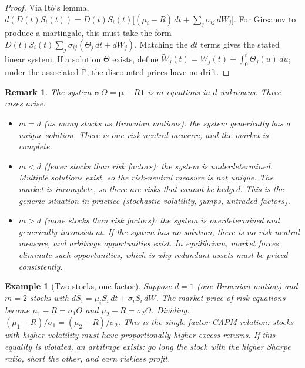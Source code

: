 \documentclass{report}
\theoremstyle{spacedplain}
\theoremstyle{spaceddefinition}
\newtheorem{example}[theorem]{Example}
\theoremstyle{spacedremark}
\newtheorem{remark}[theorem]{Remark}
\begin{document}
\begin{proof}
Via It\^o's lemma, $d(D(t)S_i(t)) = D(t)S_i(t)\bigl[(\mu_i - R)\,dt + \sum_j \sigma_{ij}\,dW_j\bigr]$. For Girsanov to produce a martingale, this must take the form $D(t)S_i(t)\sum_j \sigma_{ij}(\Theta_j\,dt + dW_j)$. Matching the $dt$ terms gives the stated linear system. If a solution $\Theta$ exists, define $\widetilde{W}_j(t) = W_j(t) + \int_0^t \Theta_j(u)\,du$; under the associated $\widetilde{\mathbb{P}}$, the discounted prices have no drift.
\end{proof}

\begin{remark}
The system $\boldsymbol{\sigma}\,\Theta = \boldsymbol{\mu} - R\mathbf{1}$ is $m$ equations in $d$ unknowns. Three cases arise:
\begin{itemize}
    \item \emph{$m = d$} (as many stocks as Brownian motions): the system generically has a unique solution. There is one risk-neutral measure, and the market is complete.
    
    \item \emph{$m < d$} (fewer stocks than risk factors): the system is underdetermined. Multiple solutions exist, so the risk-neutral measure is not unique. The market is incomplete, so there are risks that cannot be hedged. This is the generic situation in practice (stochastic volatility, jumps, untraded factors).

    \item \emph{$m > d$} (more stocks than risk factors): the system is overdetermined and generically inconsistent. If the system has no solution, there is no risk-neutral measure, and arbitrage opportunities exist. In equilibrium, market forces eliminate such opportunities, which is why redundant assets must be priced consistently.
\end{itemize}
\end{remark}

\begin{example}[Two stocks, one factor]
Suppose $d = 1$ (one Brownian motion) and $m = 2$ stocks with $dS_i = \mu_i S_i\,dt + \sigma_i S_i\,dW$. The market-price-of-risk equations become $\mu_1 - R = \sigma_1 \Theta$ and $\mu_2 - R = \sigma_2 \Theta$. Dividing: $(\mu_1 - R)/\sigma_1 = (\mu_2 - R)/\sigma_2$. This is the single-factor CAPM relation: stocks with higher volatility must have proportionally higher excess returns. If this equality is violated, an arbitrage exists: go long the stock with the higher Sharpe ratio, short the other, and earn riskless profit.
\end{example}
\end{document}

